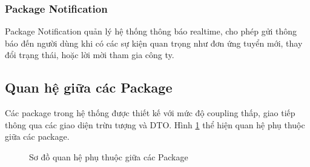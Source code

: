 \subsubsection{Package Notification}

Package Notification quản lý hệ thống thông báo realtime, cho phép gửi thông báo đến người dùng khi có các sự kiện quan trọng như đơn ứng tuyển mới, thay đổi trạng thái, hoặc lời mời tham gia công ty.

%
%
%
%
%

\subsection{Quan hệ giữa các Package}
\label{subsec:package-dependencies}

Các package trong hệ thống được thiết kế với mức độ coupling thấp, giao tiếp thông qua các giao diện trừu tượng và DTO. Hình \ref{fig:package-dependencies} thể hiện quan hệ phụ thuộc giữa các package.

%
%
%
%
%

\begin{figure}[H]
	\centering
	\caption{Sơ đồ quan hệ phụ thuộc giữa các Package}
    \label{fig:package-dependencies}
\end{figure}

